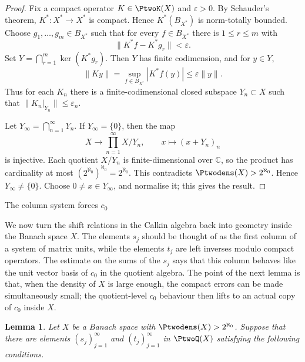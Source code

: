 \documentclass[11pt,reqno]{amsart}
\makeatletter
\theoremstyle{plain}
\newtheorem{lemma}[lemma]{Lemma}
\theoremstyle{definition}
\newcommand{\C}{\mathbb C}
\newcommand{\eps}{\varepsilon}
\newcounter{problempaper}
\newenvironment{problempaperbody}{%
  \setcounter{subsection}{0}%
  \setcounter{subsubsection}{0}%
  \setcounter{paragraph}{0}%
  \renewcommand{\thesubsection}{\arabic{subsection}}%
  \renewcommand{\thesubsubsection}{\thesubsection.\arabic{subsubsection}}%
  \renewcommand{\theparagraph}{\thesubsubsection.\arabic{paragraph}}%
  \let\problem@outersection\section
  \let\problem@outersubsection\subsection
  \let\problem@outersubsubsection\subsubsection
  \let\problem@outerparagraph\paragraph
  \let\section\problem@papersection
  \let\subsection\problem@papersubsection
  \let\subsubsection\problem@papersubsubsection
}{%
  \let\section\problem@outersection
  \let\subsection\problem@outersubsection
  \let\subsubsection\problem@outersubsubsection
  \let\paragraph\problem@outerparagraph
}
\newcommand{\problem@target}[2]{%
  \hypertarget{problem-\theproblempaper-#1-#2}{}%
}
\newcommand{\problem@paperheading}[3]{%
  \par\bigskip
  \problem@target{#1}{#2}%
  \noindent{\large\bfseries #2.\quad #3\par}%
  \nobreak\smallskip
}
\newcommand{\problem@papersubheading}[3]{%
  \par\medskip
  \problem@target{#1}{#2}%
  \noindent{\normalsize\bfseries #2.\quad #3\par}%
  \nobreak\smallskip
}
\newcommand{\problem@papersubsubheading}[3]{%
  \par\smallskip
  \problem@target{#1}{#2}%
  \noindent{\normalsize\itshape #2.\quad #3.\ }%
}
\def\problem@papersection{%
  \@ifstar{\problem@papersectionstar}{\problem@papersectionnostar}%
}
\def\problem@papersectionstar#1{%
  \par\bigskip\noindent{\large\bfseries #1\par}\nobreak\smallskip
}
\def\problem@papersectionnostar#1{%
  \refstepcounter{subsection}%
  \setcounter{subsubsection}{0}%
  \setcounter{paragraph}{0}%
  \problem@paperheading{section}{\thesubsection}{#1}%
  \problem@writecontentsline{section}{\thesubsection}{#1}%
}
\def\problem@papersubsection{%
  \@ifstar{\problem@papersubsectionstar}{\problem@papersubsectionnostar}%
}
\def\problem@papersubsectionstar#1{%
  \par\medskip\noindent{\normalsize\bfseries #1\par}\nobreak\smallskip
}
\def\problem@papersubsectionnostar#1{%
  \refstepcounter{subsubsection}%
  \setcounter{paragraph}{0}%
  \problem@papersubheading{subsection}{\thesubsubsection}{#1}%
  \problem@writecontentsline{subsection}{\thesubsubsection}{#1}%
}
\def\problem@papersubsubsection{%
  \@ifstar{\problem@papersubsubsectionstar}{\problem@papersubsubsectionnostar}%
}
\def\problem@papersubsubsectionstar#1{%
  \par\smallskip\noindent{\normalsize\itshape #1.\ }%
}
\def\problem@papersubsubsectionnostar#1{%
  \refstepcounter{paragraph}%
  \problem@papersubsubheading{subsubsection}{\theparagraph}{#1}%
  \problem@writecontentsline{subsubsection}{\theparagraph}{#1}%
}
\newcommand{\problem@writecontentsline}[3]{%
  \begingroup
  \protected@write\@auxout{}{%
    \string\problemcontentsentry{\theproblempaper}{#1}{#2}{#3}{\thepage}%
  }%
  \endgroup
}
\newcommand{\problemcontentsentry}[5]{%
  \@ifundefined{problemcontents@#1}{%
    \expandafter\gdef\csname problemcontents@#1\endcsname{}%
  }{}%
  \expandafter\g@addto@macro\csname problemcontents@#1\endcsname{%
    \problemcontentsline{#1}{#2}{#3}{#4}{#5}%
  }%
}
\newcommand{\problemcontentslink}[4]{%
  \hyperlink{problem-#1-#2-#3}{#4}%
}
\newcommand{\problemcontentsline}[5]{%
  \ifstrequal{#2}{section}{%
    \par\noindent
    \problemcontentslink{#1}{#2}{#3}{\makebox[2.5em][l]{#3}#4}%
    \nobreak\dotfill
    \problemcontentslink{#1}{#2}{#3}{#5}\par
  }{%
    \ifstrequal{#2}{subsection}{%
      \par\noindent\hspace*{1.5em}%
      \problemcontentslink{#1}{#2}{#3}{\makebox[3.5em][l]{#3}#4}%
      \nobreak\dotfill
      \problemcontentslink{#1}{#2}{#3}{#5}\par
    }{%
      \par\noindent\hspace*{3em}%
      \problemcontentslink{#1}{#2}{#3}{\makebox[4.5em][l]{#3}#4}%
      \nobreak\dotfill
      \problemcontentslink{#1}{#2}{#3}{#5}\par
    }%
  }%
}
\makeatother
\begin{document}
\begin{problempaperbody}
\begin{proof}
Fix a compact operator $K\in\PtwoK(X)$ and $\eps>0$. By Schauder's theorem, $K^*:X^*\to X^*$ is compact. Hence $K^*(B_{X^*})$ is norm-totally bounded. Choose $g_1,\ldots,g_m\in B_{X^*}$ such that for every $f\in B_{X^*}$ there is $1\leq r\leq m$ with
\begin{equation*}
        \|K^*f-K^*g_r\|<\eps.
\end{equation*}
Set $Y=\bigcap_{r=1}^{m}\ker(K^*g_r)$. Then $Y$ has finite codimension, and for $y\in Y$,
\begin{equation*}
        \|Ky\|=\sup_{f\in B_{X^*}}|K^*f(y)|\leq\eps\|y\|.
\end{equation*}
Thus for each $K_n$ there is a finite-codimensional closed subspace $Y_n\subset X$ such that $\|K_n|_{Y_n}\|\leq\eps_n$.

Let $Y_\infty=\bigcap_{n=1}^{\infty}Y_n$. If $Y_\infty=\{0\}$, then the map
\begin{equation*}
        X\to\prod_{n=1}^{\infty}X/Y_n,\qquad x\mapsto(x+Y_n)_n
\end{equation*}
is injective. Each quotient $X/Y_n$ is finite-dimensional over $\C$, so the product has cardinality at most $(2^{\aleph_0})^{\aleph_0}=2^{\aleph_0}$. This contradicts $\Ptwodens(X)>2^{\aleph_0}$. Hence $Y_\infty\ne\{0\}$. Choose $0\ne x\in Y_\infty$, and normalise it; this gives the result.
\end{proof}

\subsection{The column system forces $c_0$}
\label{p2-second:sec:column-forces-c0}

We now turn the shift relations in the Calkin algebra back into geometry inside the Banach space $X$. The elements $s_j$ should be thought of as the first column of a system of matrix units, while the elements $t_j$ are left inverses modulo compact operators. The estimate on the sums of the $s_j$ says that this column behaves like the unit vector basis of $c_0$ in the quotient algebra. The point of the next lemma is that, when the density of $X$ is large enough, the compact errors can be made simultaneously small; the quotient-level $c_0$ behaviour then lifts to an actual copy of $c_0$ inside $X$.

\begin{lemma}
\label{p2-second:lem:column-forces-c0}
Let $X$ be a Banach space with $\Ptwodens(X)>2^{\aleph_0}$. Suppose that there are elements $(s_j)_{j=1}^{\infty}$ and $(t_j)_{j=1}^{\infty}$ in $\PtwoQ(X)$ satisfying the following conditions.


\end{lemma}
\end{problempaperbody}
\end{document}
